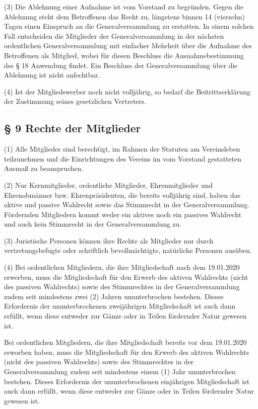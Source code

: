 \documentclass[11pt,a4paper]{article}
\begin{document}
(3)
Die Ablehnung einer Aufnahme ist vom Vorstand zu begründen.
Gegen die Ablehnung steht dem Betroffenen das Recht zu, längstens binnen 14 (vierzehn) Tagen einen Einspruch an die Generalversammlung zu erstatten.
In einem solchen Fall entscheiden die Mitglieder der Generalversammlung in der nächsten ordentlichen Generalversammlung mit einfacher Mehrheit über die Aufnahme des Betroffenen als Mitglied, wobei für diesen Beschluss die Ausnahmebestimmung des § 18 Anwendung findet.
Ein Beschluss der Generalversammlung über die Ablehnung ist nicht anfechtbar.

(4)
Ist der Mitgliedswerber noch nicht volljährig, so bedarf die Beitrittserklärung der Zustimmung seines gesetzlichen Vertreters.

\subsection{§ 9
Rechte der Mitglieder}

(1)
Alle Mitglieder sind berechtigt, im Rahmen der Statuten am Vereinsleben teilzunehmen und die Einrichtungen des Vereins im vom Vorstand gestatteten Ausmaß zu beanspruchen.

(2)
Nur Kernmitglieder, ordentliche Mitglieder, Ehrenmitglieder und Ehrenobmänner bzw. Ehrenpräsidenten, die bereits volljährig sind, haben das aktive und passive Wahlrecht sowie das Stimmrecht in der Generalversammlung.
Fördernden Mitgliedern kommt weder ein aktives noch ein passives Wahlrecht und auch kein Stimmrecht in der Generalversammlung zu.

(3)
Juristische Personen können ihre Rechte als Mitglieder nur durch vertretungsbefugte oder schriftlich bevollmächtigte, natürliche Personen ausüben.

(4)
Bei ordentlichen Mitgliedern, die ihre Mitgliedschaft nach dem 19.01.2020 erwerben, muss die Mitgliedschaft für den Erwerb des aktiven Wahlrechts (nicht des passiven Wahlrechts) sowie des Stimmrechtes in der Generalversammlung zudem seit mindestens zwei (2) Jahren ununterbrochen bestehen.
Dieses Erfordernis der ununterbrochenen zweijährigen Mitgliedschaft ist auch dann erfüllt, wenn diese entweder zur Gänze oder in Teilen fördernder Natur gewesen ist.

Bei ordentlichen Mitgliedern, die ihre Mitgliedschaft bereits vor dem 19.01.2020 erworben haben, muss die Mitgliedschaft für den Erwerb des aktiven Wahlrechts (nicht des passiven Wahlrechts) sowie des Stimmrechtes in der Generalversammlung zudem seit mindestens einem (1) Jahr ununterbrochen bestehen.
Dieses Erfordernis der ununterbrochenen einjährigen Mitgliedschaft ist auch dann erfüllt, wenn diese entweder zur Gänze oder in Teilen fördernder Natur gewesen ist.
\end{document}

